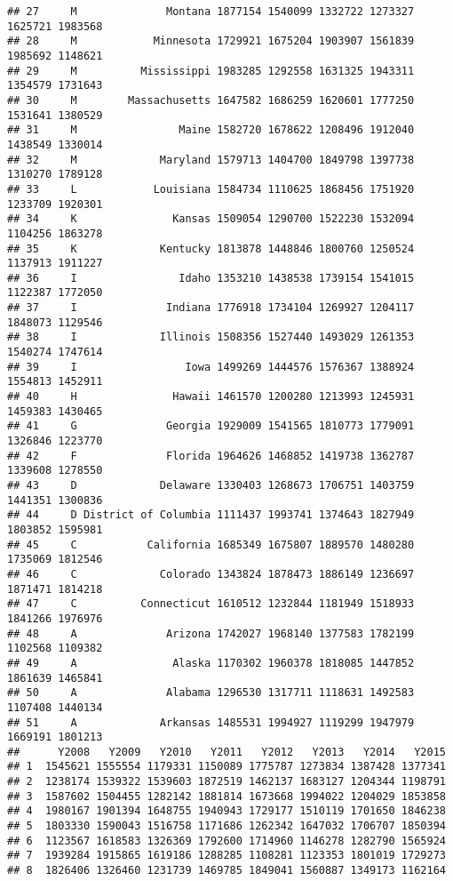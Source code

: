 \documentclass[
]{article}
\begin{document}
\begin{verbatim}
## 27     M              Montana 1877154 1540099 1332722 1273327 1625721 1983568
## 28     M            Minnesota 1729921 1675204 1903907 1561839 1985692 1148621
## 29     M          Mississippi 1983285 1292558 1631325 1943311 1354579 1731643
## 30     M        Massachusetts 1647582 1686259 1620601 1777250 1531641 1380529
## 31     M                Maine 1582720 1678622 1208496 1912040 1438549 1330014
## 32     M             Maryland 1579713 1404700 1849798 1397738 1310270 1789128
## 33     L            Louisiana 1584734 1110625 1868456 1751920 1233709 1920301
## 34     K               Kansas 1509054 1290700 1522230 1532094 1104256 1863278
## 35     K             Kentucky 1813878 1448846 1800760 1250524 1137913 1911227
## 36     I                Idaho 1353210 1438538 1739154 1541015 1122387 1772050
## 37     I              Indiana 1776918 1734104 1269927 1204117 1848073 1129546
## 38     I             Illinois 1508356 1527440 1493029 1261353 1540274 1747614
## 39     I                 Iowa 1499269 1444576 1576367 1388924 1554813 1452911
## 40     H               Hawaii 1461570 1200280 1213993 1245931 1459383 1430465
## 41     G              Georgia 1929009 1541565 1810773 1779091 1326846 1223770
## 42     F              Florida 1964626 1468852 1419738 1362787 1339608 1278550
## 43     D             Delaware 1330403 1268673 1706751 1403759 1441351 1300836
## 44     D District of Columbia 1111437 1993741 1374643 1827949 1803852 1595981
## 45     C           California 1685349 1675807 1889570 1480280 1735069 1812546
## 46     C             Colorado 1343824 1878473 1886149 1236697 1871471 1814218
## 47     C          Connecticut 1610512 1232844 1181949 1518933 1841266 1976976
## 48     A              Arizona 1742027 1968140 1377583 1782199 1102568 1109382
## 49     A               Alaska 1170302 1960378 1818085 1447852 1861639 1465841
## 50     A              Alabama 1296530 1317711 1118631 1492583 1107408 1440134
## 51     A             Arkansas 1485531 1994927 1119299 1947979 1669191 1801213
##      Y2008   Y2009   Y2010   Y2011   Y2012   Y2013   Y2014   Y2015
## 1  1545621 1555554 1179331 1150089 1775787 1273834 1387428 1377341
## 2  1238174 1539322 1539603 1872519 1462137 1683127 1204344 1198791
## 3  1587602 1504455 1282142 1881814 1673668 1994022 1204029 1853858
## 4  1980167 1901394 1648755 1940943 1729177 1510119 1701650 1846238
## 5  1803330 1590043 1516758 1171686 1262342 1647032 1706707 1850394
## 6  1123567 1618583 1326369 1792600 1714960 1146278 1282790 1565924
## 7  1939284 1915865 1619186 1288285 1108281 1123353 1801019 1729273
## 8  1826406 1326460 1231739 1469785 1849041 1560887 1349173 1162164

\end{verbatim}
\end{document}
